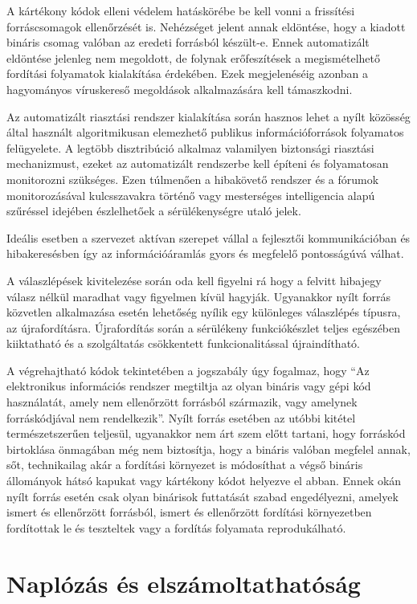 \documentclass[12pt,magyar,a4paper,oneside]{scrreprt}
\begin{document}
A kártékony kódok elleni védelem hatáskörébe be kell vonni a frissítési
forráscsomagok ellenőrzését is. Nehézséget jelent annak eldöntése, hogy
a kiadott bináris csomag valóban az eredeti forrásból készült-e. Ennek
automatizált eldöntése jelenleg nem megoldott, de folynak erőfeszítések
a megismételhető fordítási folyamatok kialakítása érdekében. Ezek
megjelenéséig azonban a hagyományos víruskereső megoldások alkalmazására
kell támaszkodni.

Az automatizált riasztási rendszer kialakítása során hasznos lehet a
nyílt közösség által használt algoritmikusan elemezhető publikus
információforrások folyamatos felügyelete. A legtöbb disztribúció
alkalmaz valamilyen biztonsági riasztási mechanizmust, ezeket az
automatizált rendszerbe kell építeni és folyamatosan monitorozni
szükséges. Ezen túlmenően a hibakövető rendszer és a fórumok
monitorozásával kulcsszavakra történő vagy mesterséges intelligencia
alapú szűréssel idejében észlelhetőek a sérülékenységre utaló jelek.

Ideális esetben a szervezet aktívan szerepet vállal a fejlesztői
kommunikációban és hibakeresésben így az információáramlás gyors és
megfelelő pontosságúvá válhat.

A válaszlépések kivitelezése során oda kell figyelni rá hogy a felvitt
hibajegy válasz nélkül maradhat vagy figyelmen kívül hagyják. Ugyanakkor
nyílt forrás közvetlen alkalmazása esetén lehetőség nyílik egy
különleges válaszlépés típusra, az újrafordításra. Újrafordítás során a
sérülékeny funkciókészlet teljes egészében kiiktatható és a szolgáltatás
csökkentett funkcionalitással újraindítható.

A végrehajtható kódok tekintetében a jogszabály úgy fogalmaz, hogy ``Az
elektronikus információs rendszer megtiltja az olyan bináris vagy gépi
kód használatát, amely nem ellenőrzött forrásból származik, vagy
amelynek forráskódjával nem rendelkezik''. Nyílt forrás esetében az
utóbbi kitétel természetszerűen teljesül, ugyanakkor nem árt szem előtt
tartani, hogy forráskód birtoklása önmagában még nem biztosítja, hogy a
bináris valóban megfelel annak, sőt, technikailag akár a fordítási
környezet is módosíthat a végső bináris állományok hátsó kapukat vagy
kártékony kódot helyezve el abban. Ennek okán nyílt forrás esetén csak
olyan binárisok futtatását szabad engedélyezni, amelyek ismert és
ellenőrzött forrásból, ismert és ellenőrzött fordítási környezetben
fordítottak le és teszteltek vagy a fordítás folyamata reprodukálható.

\hypertarget{napluxf3zuxe1s-uxe9s-elszuxe1moltathatuxf3suxe1g}{%
\section{Naplózás és
elszámoltathatóság}\label{napluxf3zuxe1s-uxe9s-elszuxe1moltathatuxf3suxe1g}}
\end{document}
